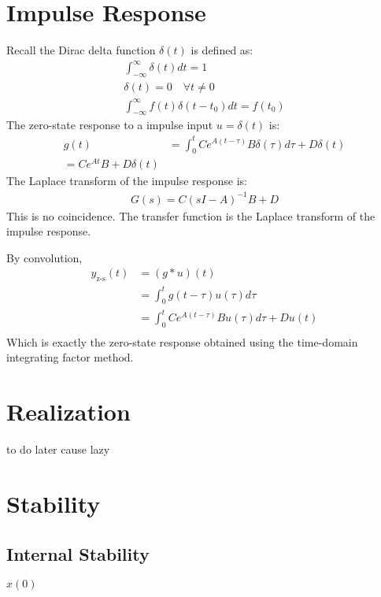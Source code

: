 \documentclass[letterpaper,12pt]{article}
\begin{document}
\section{Impulse Response}
Recall the Dirac delta function $\delta(t)$ is defined as:
\begin{align*}
    \int_{-\infty}^{\infty} \delta(t) dt = 1 \\
    \delta(t) = 0 \quad \forall t \neq 0 \\
    \int_{-\infty}^{\infty} f(t)\delta(t-t_0) dt = f(t_0)
\end{align*}
The zero-state response to a impulse input $u = \delta(t)$ is:
\begin{align*}
    g(t) &= \int_{0}^{t} C e^{A(t-\tau)}B \delta(\tau) d\tau + D \delta(t) \\
    = C e^{At}B + D \delta(t)
\end{align*}
The Laplace transform of the impulse response is:
\begin{align*}
    G(s) = C(sI - A)^{-1}B + D
\end{align*}
This is no coincidence. The transfer function is the Laplace transform of the
impulse response.

By convolution,
\begin{align*}
    y_{\text{z-s}}(t) &= (g * u)(t) \\
    &= \int_{0}^{t} g(t - \tau) u(\tau) d\tau \\
    &= \int_{0}^{t} C e^{A(t-\tau)}B u(\tau) d\tau + D u(t) \\
\end{align*}
Which is exactly the zero-state response obtained using the time-domain integrating
factor method.

\section{Realization}
to do later cause lazy

\section{Stability}
\subsection{Internal Stability}
$x(0)$
\end{document}
